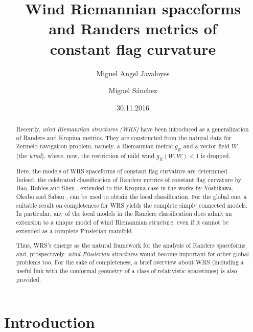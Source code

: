 \documentclass[reqno,10pt]{amsart}
\title[Wind Riemannian structures]{Wind Riemannian spaceforms \\ and Randers metrics of \\ constant flag curvature}
\author[M. A. Javaloyes]{Miguel Angel Javaloyes}
\author[M. S\'anchez]{Miguel S\'anchez}
\date{30.11.2016}
\begin{document}
\newtheorem{thm}{Theorem}[section]
\newtheorem{prop}[thm]{Proposition}
\newtheorem{lemma}[thm]{Lemma}
\newtheorem{cor}[thm]{Corollary}
\theoremstyle{definition}
\newtheorem{defi}[thm]{Definition}
\newtheorem{notation}[thm]{Notation}
\newtheorem{exe}[thm]{Example}
\newtheorem{conj}[thm]{Conjecture}
\newtheorem{prob}[thm]{Problem}
\newtheorem{rem}[thm]{Remark}
\newtheorem{conv}[thm]{Convention}
\newtheorem{crit}[thm]{Criterion}


\begin{abstract}
Recently, {\em wind Riemannian structures (WRS)} have been introduced  as a  generalization of Randers and Kropina metrics. They are constructed from the natural data for Zermelo navigation problem, namely, a Riemannian metric   $g_R$ and a vector field  $W$ (the {\em wind}), where, now, the restriction of mild wind $g_R(W,W)<1$ is dropped. 

Here,  the models of  WRS spaceforms of constant flag curvature are determined. Indeed, 
the celebrated classification of Randers metrics of constant flag curvature  by Bao, Robles and Shen \cite{BRS}, extended to the Kropina case in the  works by Yoshikawa, Okubo and Sabau \cite{YoOk07, YoSa}, can be used to obtain the  local classification. For the global one, a suitable result on completeness for WRS yields  
the complete simply connected models. 
In particular, any of the local models in the Randers classification does admit an extension to a unique model of wind Riemannian structure, even if it cannot be extended 
as a complete Finslerian manifold.


Thus,  WRS's  emerge as the natural framework for the analysis of Randers spaceforms and, prospectively,  {\em wind  Finslerian structures} would become important for other global problems too. 
For the sake of completeness, a brief  overview about WRS (including  a  useful link with the conformal geometry of a class of relativistic  spacetimes) is also provided. 


\end{abstract}



\maketitle


\section{Introduction}
\end{document}

